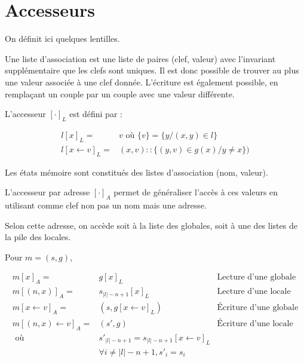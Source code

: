\section{Accesseurs}
\label{sec:mem-access}

On définit ici quelques lentilles.

\begin{definition}

  Une liste d'association est une liste de paires (clef, valeur) avec
  l'invariant supplémentaire que les clefs sont uniques. Il est donc possible de
  trouver au plus une valeur associée à une clef donnée. L'écriture est
  également possible, en remplaçant un couple par un couple avec une valeur
  différente.

  L'accesseur $[\cdot]_L$ est défini par :

  \begin{align*}
    l[x]_L     = & v \mbox{ où } \{v\} = \{y / (x, y) ∈ l\} \\
    l[x ← v]_L = & (x, v) :: \{ (y, v) ∈ g(x) / y ≠ x \})
  \end{align*}

\end{definition}

\begin{definition}

  Les états mémoire sont constitués des listes d'association (nom, valeur).

  L'accesseur par adresse $[\cdot]_A$ permet de généraliser l'accès à ces
  valeurs en utilisant comme clef non pas un nom mais une adresse.

  Selon cette adresse, on accède soit à la liste des globales, soit à une des
  listes de la pile des locales.

  Pour $m = (s, g)$,

  \begin{align*}
    m [x]_A          = & g[x]_L           & \textrm{Lecture d'une globale} \\
    m [(n, x)]_A     = & s_{|l|-n+1}[x]_L & \textrm{Lecture d'une locale} \\
    m [x ← v]_A      = & (s, g[x←v]_L)    & \textrm{Écriture d'une globale} \\
    m [(n, x) ← v]_A = & (s', g)          & \textrm{Écriture d'une locale} \\
           \mbox{ où } & s'_{|l|-n+1} = s_{|l|-n+1}[x ← v]_L \\
                       & ∀ i ≠ |l|-n+1, s'_i = s_i
  \end{align*}


\end{definition}


